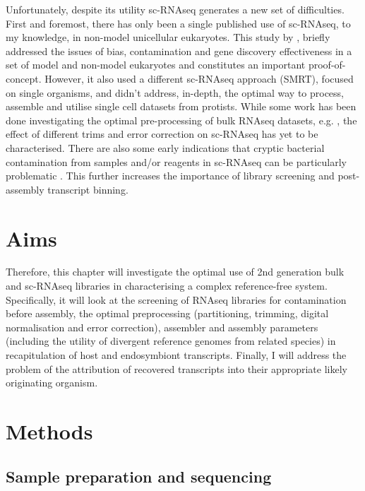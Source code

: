 Unfortunately, despite its utility sc-RNAseq generates a new set of difficulties.
First and foremost, there has only been a single published use of sc-RNAseq, to my knowledge, in non-model unicellular eukaryotes.   
This study by \citep{Kolisko2014}, briefly addressed the issues of bias, contamination and gene discovery effectiveness in a set of model and non-model eukaryotes and
constitutes an important proof-of-concept.  
However, it also used a different sc-RNAseq approach (SMRT), focused on single organisms, 
and didn't address, in-depth, the optimal way to process, assemble and utilise single cell datasets from protists.
While some work has been done investigating the optimal pre-processing of bulk RNAseq datasets, e.g. \citep{Macmanes2013,Macmanes2015},
the effect of different trims and error correction on sc-RNAseq has yet to be characterised.  
There are also some early indications that cryptic bacterial contamination
from samples and/or reagents in sc-RNAseq can be particularly problematic \citep{Kolisko2014}. 
This further increases the importance of library screening and post-assembly transcript binning.

\section{Aims}
Therefore, this chapter will investigate the optimal use of 2nd generation bulk and sc-RNAseq libraries
in characterising a complex reference-free system.  Specifically, it will look at the screening of RNAseq libraries for contamination
before assembly, the optimal preprocessing (partitioning, trimming, digital normalisation and error correction), assembler and assembly
parameters (including the utility of divergent reference genomes from related species) in recapitulation of host and endosymbiont transcripts.
Finally, I will address the problem of the attribution of recovered transcripts into their appropriate likely originating organism.  
\section{Methods} 

\subsection{Sample preparation and sequencing}

